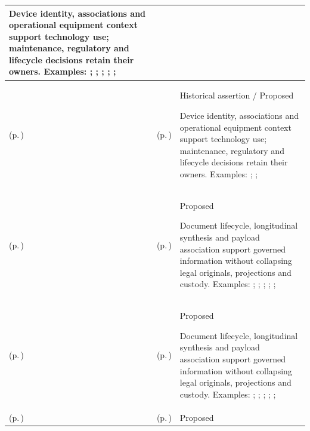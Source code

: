 \begin{longtable}{|>{\raggedright\arraybackslash}p{0.27\TableWidth}|>{\raggedright\arraybackslash}p{0.27\TableWidth}|>{\raggedright\arraybackslash}p{0.46\TableWidth}|}
Device identity, associations and operational equipment context support technology use; maintenance, regulatory and lifecycle decisions retain their owners. Examples: \nameref{function:maintain-device-definition}; \nameref{service:device-definition-query}; \nameref{function:maintain-device-instance-identity}; \nameref{service:device-instance-resolution}; \nameref{function:maintain-device-association}; \nameref{service:device-association-query}\\\hline
\nameref{cap:bc-clinical-technology-management} (p.\,\pageref{cap:bc-clinical-technology-management}) & \nameref{cap:bec-clinical-resource-management} (p.\,\pageref{cap:bec-clinical-resource-management}) & Historical assertion / Proposed

Device identity, associations and operational equipment context support technology use; maintenance, regulatory and lifecycle decisions retain their owners. Examples: \nameref{feature:feat-hso-14}; \nameref{function:track-mobile-clinical-asset-operational-state}; \nameref{service:clinical-resource-availability-query}\\\hline
\nameref{cap:bc-health-information-management} (p.\,\pageref{cap:bc-health-information-management}) & \nameref{cap:bec-patient-clinical-record} (p.\,\pageref{cap:bec-patient-clinical-record}) & Proposed

Document lifecycle, longitudinal synthesis and payload association support governed information without collapsing legal originals, projections and custody. Examples: \nameref{feature:feat-ise-01}; \nameref{feature:feat-ise-02}; \nameref{feature:feat-ise-03}; \nameref{function:assemble-longitudinal-clinical-record}; \nameref{service:longitudinal-clinical-record-query}; \nameref{function:maintain-active-clinical-record}\\\hline
\nameref{cap:bc-health-information-management} (p.\,\pageref{cap:bc-health-information-management}) & \nameref{cap:bec-clinical-record-administration} (p.\,\pageref{cap:bec-clinical-record-administration}) & Proposed

Document lifecycle, longitudinal synthesis and payload association support governed information without collapsing legal originals, projections and custody. Examples: \nameref{feature:feat-sa-23}; \nameref{feature:feat-sa-24}; \nameref{feature:feat-sa-25}; \nameref{function:receive-clinical-document}; \nameref{service:clinical-document-ingress}; \nameref{function:govern-clinical-document-lifecycle}\\\hline
\nameref{cap:bc-health-information-management} (p.\,\pageref{cap:bc-health-information-management}) & \nameref{cap:bec-associated-clinical-binary-content-enablement} (p.\,\pageref{cap:bec-associated-clinical-binary-content-enablement}) & Proposed


\end{longtable}
